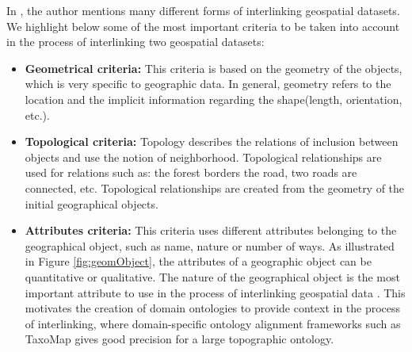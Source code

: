 In \cite{anamaria08}, the author mentions many different forms of interlinking geospatial datasets. We highlight below some of the most important criteria to be taken into account in the process of interlinking two geospatial datasets:
\begin{itemize}
\item \textbf{Geometrical criteria:} This criteria is based on the geometry of the objects, which is very specific to geographic data. In general, geometry refers to the location and the implicit information regarding the shape(length, orientation, etc.).
\item \textbf{Topological criteria:}
Topology describes the relations of inclusion between objects and use the notion of neighborhood. Topological relationships are used for relations such as: the forest borders the road, two roads are connected, etc. Topological relationships are created from the geometry of the initial geographical objects.
\item \textbf{Attributes criteria:} This criteria uses different attributes belonging to the geographical object, such as name, nature or number of ways. As illustrated in Figure \ref{fig:geomObject}, the attributes of a geographic object can be quantitative or qualitative. The nature of the geographical object is the most important attribute to use in the process of interlinking geospatial data \cite{anamaria08}. This motivates the creation of domain ontologies to provide context in the process of interlinking, where domain-specific ontology alignment frameworks such as TaxoMap \cite{reynaud2007,hamdi2010} gives good precision for a large topographic ontology.

\end{itemize}

\begin{figure}[ht!b]
\end{figure}


